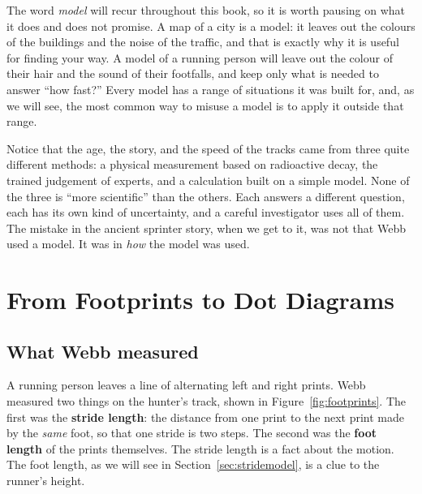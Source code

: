 \documentclass[11pt,twoside,openany]{book}
\begin{document}
The word \emph{model} will recur throughout this book, so it is worth pausing on what it does and does not promise. A map of a city is a model: it leaves out the colours of the buildings and the noise of the traffic, and that is exactly why it is useful for finding your way. A model of a running person will leave out the colour of their hair and the sound of their footfalls, and keep only what is needed to answer ``how fast?'' Every model has a range of situations it was built for, and, as we will see, the most common way to misuse a model is to apply it outside that range.

\begin{modelnote}
Notice that the age, the story, and the speed of the tracks came from three quite different methods: a physical measurement based on radioactive decay, the trained judgement of experts, and a calculation built on a simple model. None of the three is ``more scientific'' than the others. Each answers a different question, each has its own kind of uncertainty, and a careful investigator uses all of them. The mistake in the ancient sprinter story, when we get to it, was not that Webb used a model. It was in \emph{how} the model was used.
\end{modelnote}

\section{From Footprints to Dot Diagrams}

\subsection{What Webb measured}

A running person leaves a line of alternating left and right prints. Webb measured two things on the hunter's track, shown in Figure~\ref{fig:footprints}. The first was the \textbf{stride length}: the distance from one print to the next print made by the \emph{same} foot, so that one stride is two steps. The second was the \textbf{foot length} of the prints themselves. The stride length is a fact about the motion. The foot length, as we will see in Section~\ref{sec:stridemodel}, is a clue to the runner's height.
\end{document}
